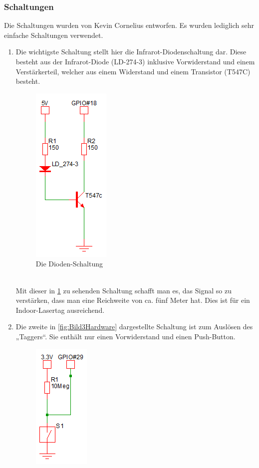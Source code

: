 \subsubsection{Schaltungen}
\label{sec:schaltungen}

Die Schaltungen wurden von Kevin Cornelius entworfen.
Es wurden lediglich sehr einfache Schaltungen verwendet.
\begin{enumerate}
	\item Die wichtigste Schaltung stellt hier die Infrarot-Diodenschaltung dar. Diese besteht aus der Infrarot-Diode (LD-274-3) inklusive Vorwiderstand und einem Verstärkerteil, welcher aus einem Widerstand und einem Transistor (T547C) besteht.\\
	\begin{figure}[h]
		\centering
		\includegraphics[width=0.2 \textwidth]{./040-komponenten/010-hardware/Diodenschaltung.png}
		\caption{Die Dioden-Schaltung}
		\label{fig:Bild2Hardware}
	\end{figure}\\
	Mit dieser in \cref{fig:Bild2Hardware} zu sehenden Schaltung schafft man es, das Signal so zu verstärken, dass man eine Reichweite von ca. fünf Meter hat. Dies ist für ein Indoor-Lasertag ausreichend.
	\item Die zweite in \cref{fig:Bild3Hardware} dargestellte Schaltung ist zum Auslösen des „Taggers“. Sie enthält nur einen Vorwiderstand und einen Push-Button. \\
	\begin{figure}[h]
		\centering
		\includegraphics[width=0.2 \textwidth]{./040-komponenten/010-hardware/Button.png}

\end{figure}
\end{enumerate}
